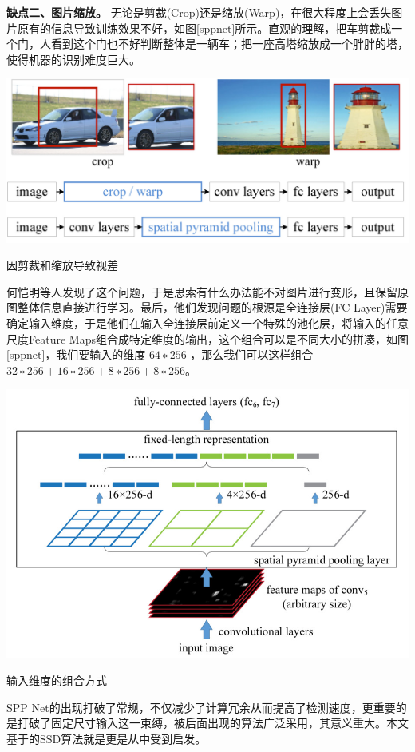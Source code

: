 \textbf{缺点二、图片缩放。}
无论是剪裁(Crop)还是缩放(Warp)，在很大程度上会丢失图片原有的信息导致训练效果不好，如图\ref{sppnet}所示。直观的理解，把车剪裁成一个门，人看到这个门也不好判断整体是一辆车；把一座高塔缩放成一个胖胖的塔，使得机器的识别难度巨大。
\begin{uscfigure}
	\includegraphics[width=\textwidth]{./Pictures/sppnet_crop_warp.jpg}	
	\caption{因剪裁和缩放导致视差}
	\label{sppnet}
\end{uscfigure}
何恺明等人发现了这个问题，于是思索有什么办法能不对图片进行变形，且保留原图整体信息直接进行学习。最后，他们发现问题的根源是全连接层(FC Layer)需要确定输入维度，于是他们在输入全连接层前定义一个特殊的池化层，将输入的任意尺度Feature Maps组合成特定维度的输出，这个组合可以是不同大小的拼凑，如图\ref{sppnet}，我们要输入的维度 $64∗256$ ，那么我们可以这样组合 $32∗256+16∗256+8∗256+8∗256$。
\begin{uscfigure}
	\includegraphics[width=\textwidth,]{./Pictures/sppnet_pool_layer.jpg}	
	\caption{输入维度的组合方式}
	\label{sppnet}
\end{uscfigure}
SPP Net的出现打破了常规，不仅减少了计算冗余从而提高了检测速度，更重要的是打破了固定尺寸输入这一束缚，被后面出现的算法广泛采用，其意义重大。本文基于的SSD算法就是更是从中受到启发。

